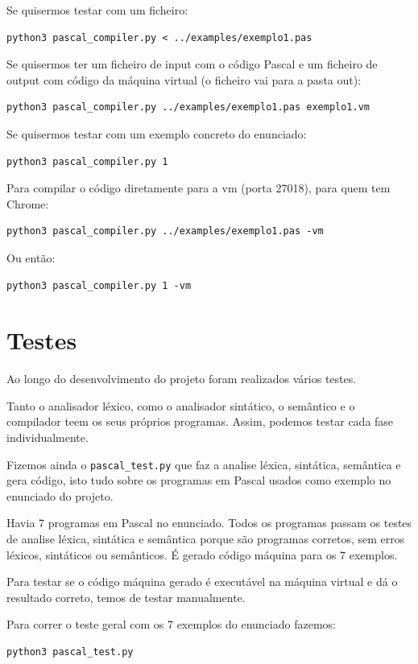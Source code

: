 \documentclass[12pt,a4paper]{report}
\begin{document}
Se quisermos testar com um ficheiro:
\begin{verbatim}
python3 pascal_compiler.py < ../examples/exemplo1.pas
\end{verbatim}

Se quisermos ter um ficheiro de input com o código Pascal e um ficheiro de output com código da máquina virtual (o ficheiro vai para a pasta out):
\begin{verbatim}
python3 pascal_compiler.py ../examples/exemplo1.pas exemplo1.vm
\end{verbatim}

Se quisermos testar com um exemplo concreto do enunciado:
\begin{verbatim}
python3 pascal_compiler.py 1
\end{verbatim}

Para compilar o código diretamente para a vm (porta 27018), para quem tem Chrome:
\begin{verbatim}
python3 pascal_compiler.py ../examples/exemplo1.pas -vm
\end{verbatim}

Ou então:

\begin{verbatim}
python3 pascal_compiler.py 1 -vm
\end{verbatim}

\chapter{Testes}

Ao longo do desenvolvimento do projeto foram realizados vários testes.

Tanto o analisador léxico, como o analisador sintático, o semântico e o compilador teem os seus próprios programas. Assim, podemos testar cada fase individualmente.

Fizemos ainda o \texttt{pascal\_test.py} que faz a analise léxica, sintática, semântica e gera código, isto tudo sobre os programas em Pascal usados como exemplo no
enunciado do projeto.

Havia 7 programas em Pascal no enunciado. Todos os programas passam os testes de analise léxica, sintática e semântica porque são programas corretos, sem erros léxicos, sintáticos ou semânticos.
É gerado código máquina  para os 7 exemplos.

Para testar se o código máquina gerado é executável na máquina virtual e dá o resultado correto, temos de testar manualmente.

\vspace{1em}
Para correr o teste geral com os 7 exemplos do enunciado fazemos:
\begin{verbatim}
python3 pascal_test.py
\end{verbatim}
\end{document}
